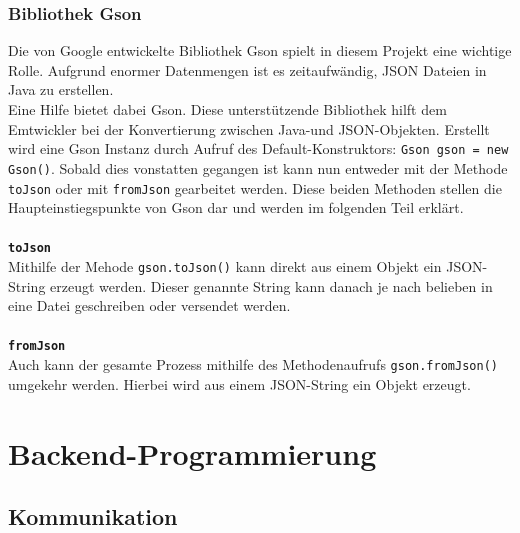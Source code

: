 \subsubsection{Bibliothek Gson}\label{sssec:gson}
Die von Google entwickelte Bibliothek Gson spielt in diesem Projekt eine wichtige Rolle.
Aufgrund enormer Datenmengen ist es zeitaufwändig, JSON Dateien in Java zu erstellen.\\
Eine Hilfe bietet dabei Gson.
Diese unterstützende Bibliothek hilft dem Emtwickler bei der Konvertierung zwischen Java-und JSON-Objekten.
Erstellt wird eine Gson Instanz durch Aufruf des Default-Konstruktors: \lstinline[style=java]{Gson gson = new Gson()}.
Sobald dies vonstatten gegangen ist kann nun entweder mit der Methode \lstinline{toJson} oder mit \lstinline{fromJson} gearbeitet werden.
Diese beiden Methoden stellen die Haupteinstiegspunkte von Gson dar und werden im folgenden Teil erklärt.
\\\\
\textbf{\lstinline{toJson}}
\\
Mithilfe der Mehode \lstinline[style=java]{gson.toJson()} kann direkt aus einem Objekt ein JSON-String erzeugt werden.
Dieser genannte String kann danach je nach belieben in eine Datei geschreiben oder versendet werden.
\\\\
\textbf{\lstinline{fromJson}}
\\
Auch kann der gesamte Prozess mithilfe des Methodenaufrufs \lstinline[style=java]{gson.fromJson()} umgekehr werden.
Hierbei wird aus einem JSON-String ein Objekt erzeugt.
\\
\section{Backend-Programmierung}\label{sec:backend-programmierung}
\subsection{Kommunikation}
